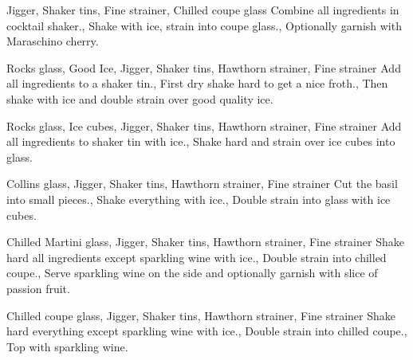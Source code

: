 \documentclass[../main.tex]{subfiles}
\begin{document}
\clearpage
{}

{Jigger, Shaker tins, Fine strainer, Chilled coupe glass}
{
    Combine all ingredients in cocktail shaker.,
    {Shake with ice, strain into coupe glass.},
    Optionally garnish with Maraschino cherry.
}

\cocktailDivider

{Rocks glass, Good Ice, Jigger, Shaker tins, Hawthorn strainer, Fine strainer}
{
    {Add all ingredients to a shaker tin.},
    {First dry shake hard to get a nice froth.},
    {Then shake with ice and double strain over good quality ice.}
}

\cocktailDivider

{Rocks glass, Ice cubes, Jigger, Shaker tins, Hawthorn strainer, Fine strainer}
{
    {Add all ingredients to shaker tin with ice.},
    {Shake hard and strain over ice cubes into glass.}
}

\cocktailDivider

{Collins glass, Jigger, Shaker tins, Hawthorn strainer, Fine strainer}
{
    {Cut the basil into small pieces.},
    {Shake everything with ice.},
    {Double strain into glass with ice cubes.}
}

\pagebreak

{Chilled Martini glass, Jigger, Shaker tins, Hawthorn strainer, Fine strainer}
{
    {Shake hard all ingredients except sparkling wine with ice.},
    {Double strain into chilled coupe.},
    {Serve sparkling wine on the side and optionally garnish with slice of passion fruit.}
}

\cocktailDivider

{Chilled coupe glass, Jigger, Shaker tins, Hawthorn strainer, Fine strainer}
{
    {Shake hard everything except sparkling wine with ice.},
    {Double strain into chilled coupe.},
    {Top with sparkling wine.}
}
\end{document}
